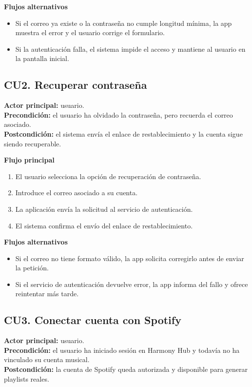 \textbf{Flujos alternativos}
\begin{itemize}
    \item Si el correo ya existe o la contraseña no cumple longitud mínima, la app muestra el error y el usuario corrige el formulario.
    \item Si la autenticación falla, el sistema impide el acceso y mantiene al usuario en la pantalla inicial.
\end{itemize}

\subsection{CU2. Recuperar contraseña}

\textbf{Actor principal:} usuario. \\
\textbf{Precondición:} el usuario ha olvidado la contraseña, pero recuerda el
correo asociado. \\
\textbf{Postcondición:} el sistema envía el enlace de restablecimiento y la
cuenta sigue siendo recuperable.

\textbf{Flujo principal}
\begin{enumerate}[label=\arabic*.]
    \item El usuario selecciona la opción de recuperación de contraseña.
    \item Introduce el correo asociado a su cuenta.
    \item La aplicación envía la solicitud al servicio de autenticación.
    \item El sistema confirma el envío del enlace de restablecimiento.
\end{enumerate}

\textbf{Flujos alternativos}
\begin{itemize}
    \item Si el correo no tiene formato válido, la app solicita corregirlo antes de enviar la petición.
    \item Si el servicio de autenticación devuelve error, la app informa del fallo y ofrece reintentar más tarde.
\end{itemize}

\subsection{CU3. Conectar cuenta con Spotify}

\textbf{Actor principal:} usuario. \\
\textbf{Precondición:} el usuario ha iniciado sesión en Harmony Hub y todavía no
ha vinculado su cuenta musical. \\
\textbf{Postcondición:} la cuenta de Spotify queda autorizada y disponible para
generar playlists reales.

